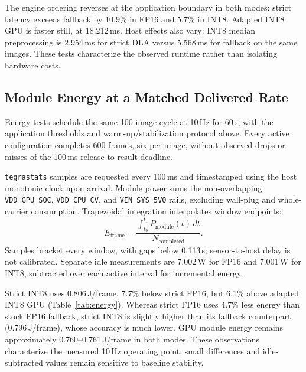 The engine ordering reverses at the application boundary in both modes:
strict latency exceeds fallback by 10.9\% in FP16 and 5.7\% in INT8. Adapted
INT8 GPU is faster still, at 18.212\,ms. Host effects also vary: INT8 median
preprocessing is 2.954\,ms for strict DLA versus 5.568\,ms for fallback on
the same images. These tests characterize the observed runtime rather than
isolating hardware costs.

\subsection{Module Energy at a Matched Delivered Rate}
\label{sec:energy}
Energy tests schedule the same 100-image cycle at 10\,Hz for 60\,s, with the
application thresholds and warm-up/stabilization protocol above. Every active
configuration completes 600 frames, six per image, without observed drops or
misses of the 100\,ms release-to-result deadline.

\texttt{tegrastats} samples are requested every 100\,ms and timestamped using
the host monotonic clock upon arrival. Module power sums the non-overlapping \texttt{VDD\_GPU\_SOC},
\texttt{VDD\_CPU\_CV}, and \texttt{VIN\_SYS\_5V0} rails, excluding wall-plug
and whole-carrier consumption. Trapezoidal integration interpolates window
endpoints:
\begin{equation}
 E_{\mathrm{frame}}=\frac{\int_{t_0}^{t_1}P_{\mathrm{module}}(t)\,dt}
 {N_{\mathrm{completed}}}.
 \label{eq:energy}
\end{equation}
Samples bracket every window, with gaps below 0.113\,s; sensor-to-host delay
is not calibrated. Separate idle measurements are 7.002\,W for FP16 and
7.001\,W for INT8, subtracted over each active interval for incremental energy.


Strict INT8 uses 0.806\,J/frame, 7.7\% below strict FP16, but 6.1\% above
adapted INT8 GPU (Table~\ref{tab:energy}). Whereas strict FP16 uses 4.7\% less
energy than stock FP16 fallback, strict INT8 is slightly higher than its
fallback counterpart (0.796\,J/frame), whose accuracy is much lower.
GPU module energy remains approximately 0.760--0.761\,J/frame in both modes.
These observations characterize the measured 10\,Hz operating point; small
differences and idle-subtracted values remain sensitive to baseline stability.

